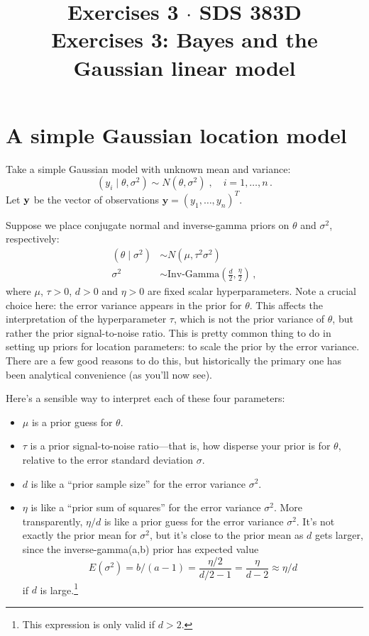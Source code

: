\documentclass[11pt]{article}
\title{Exercises 3 $\cdot$ SDS 383D \\ Exercises 3: Bayes and the Gaussian linear model}
\date{}  %
\begin{document}
\maketitle%


\section{A simple Gaussian location model}

Take a simple Gaussian model with unknown mean and variance:
\begin{equation}
\label{eqn:normal_model}
(y_i \mid \theta, \sigma^2) \sim N(\theta, \sigma^2) \; , \quad i = 1, \ldots, n \, .
\end{equation}
Let $\bf{y}$ be the vector of observations $\textbf{y} = (y_1, \ldots, y_n)^T$.

Suppose we place conjugate normal and inverse-gamma priors on $\theta$ and $\sigma^2$, respectively:
\begin{align*}
(\theta \mid \sigma^2) &\sim N(\mu, \tau^2 \sigma^2) \\
\sigma^2 &\sim \mbox{Inv-Gamma}\left( \frac{d}{2}, \frac{ \eta}{2} \right) \, ,
\end{align*}
where $\mu$, $\tau > 0$, $d>0$ and $\eta > 0$ are fixed scalar hyperparameters.  Note a crucial choice here: the error variance appears in the prior for $\theta$.  This affects the interpretation of the hyperparameter $\tau$, which is not the prior variance of $\theta$, but rather the prior signal-to-noise ratio.  This is pretty common thing to do in setting up priors for location parameters: to scale the prior by the error variance.  There are a few good reasons to do this, but historically the primary one has been analytical convenience (as you'll now see).

Here's a sensible way to interpret each of these four parameters:
\begin{itemize}
\item $\mu$ is a prior guess for $\theta$.
\item $\tau$ is a prior signal-to-noise ratio---that is, how disperse your prior is for $\theta$, relative to the error standard deviation $\sigma$.
\item $d$ is like a ``prior sample size'' for the error variance $\sigma^2$.
\item $\eta$ is like a ``prior sum of squares'' for the error variance $\sigma^2$.  More transparently, $\eta/d$ is like a prior guess for the error variance $\sigma^2$.  It's not exactly the prior mean for $\sigma^2$, but it's close to the prior mean as $d$ gets larger, since the inverse-gamma(a,b) prior has expected value
$$
E(\sigma^2) = b/(a-1) =  \frac{\eta / 2}{d/2 - 1} = \frac{\eta}{d - 2} \approx \eta/d
$$
if $d$ is large.\footnote{This expression is only valid if $d > 2$.}
\end{itemize}
\end{document}
